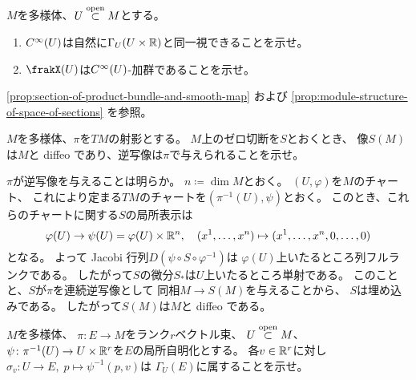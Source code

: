 \documentclass[report]{jlreq}
\begin{document}
\begin{problem}[幾何学III 問1.1.30]
    $M$を多様体、$U \stackrel{\text{open}}{\subset} M$とする。
    \begin{enumerate}
        \item $C^\infty(U)$は自然に$\Gamma_U(U \times \mathbb{R})$と同一視できることを示せ。
        \item $\frakX(U)$は$C^\infty(U)$-加群であることを示せ。
    \end{enumerate}
\end{problem}

\begin{answer}
    \cref{prop:section-of-product-bundle-and-smooth-map} および
    \cref{prop:module-structure-of-space-of-sections} を参照。
\end{answer}

\begin{problem}[幾何学III 問1.1.31]
    $M$を多様体、$\pi$を$TM$の射影とする。
    $M$上のゼロ切断を$S$とおくとき、
    像$S(M)$は$M$と diffeo であり、逆写像は$\pi$で与えられることを示せ。
\end{problem}

\begin{answer}
    $\pi$が逆写像を与えることは明らか。
    $n \coloneqq \dim M$とおく。
    $(U, \varphi)$を$M$のチャート、
    これにより定まる$TM$のチャートを$(\pi^{-1}(U), \psi)$とおく。
    このとき、これらのチャートに関する$S$の局所表示は
    \begin{equation}
        \varphi(U) \to \psi(U) = \varphi(U) \times \mathbb{R}^n,
        \quad
        (x^1, \dots, x^n) \mapsto (x^1, \dots, x^n, 0, \dots, 0)
    \end{equation}
    となる。
    よって Jacobi 行列$D(\psi \circ S \circ \varphi^{-1})$は
    $\varphi(U)$上いたるところ列フルランクである。
    したがって$S$の微分$S_*$は$U$上いたるところ単射である。
    このことと、$S$が$\pi$を連続逆写像として
    同相$M \to S(M)$を与えることから、
    $S$は埋め込みである。
    したがって$S(M)$は$M$と diffeo である。
\end{answer}

\begin{problem}[幾何学III 問1.1.32]
    $M$を多様体、
    $\pi \colon E \to M$をランク$r$ベクトル束、
    $U \stackrel{\text{open}}{\subset} M$、
    $\psi \colon \pi^{-1}(U) \to U \times \mathbb{R}^r$を$E$の局所自明化とする。
    各$v \in \mathbb{R}^r$に対し
    $\sigma_v \colon U \to E, \; p \mapsto \psi^{-1}(p, v)$は
    $\Gamma_U(E)$に属することを示せ。
\end{problem}

\begin{answer}
    \TODO{}
\end{answer}
\end{document}

